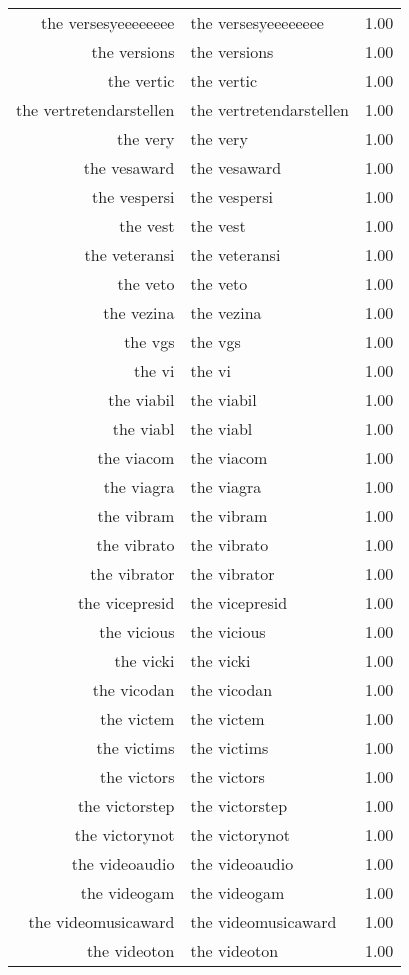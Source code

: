 \begin{table}[ht]
\begin{tabular}{rlr}
  the versesyeeeeeeee & the versesyeeeeeeee & 1.00 \\ 
  the versions & the versions & 1.00 \\ 
  the vertic & the vertic & 1.00 \\ 
  the vertretendarstellen & the vertretendarstellen & 1.00 \\ 
  the very & the very & 1.00 \\ 
  the vesaward & the vesaward & 1.00 \\ 
  the vespersi & the vespersi & 1.00 \\ 
  the vest & the vest & 1.00 \\ 
  the veteransi & the veteransi & 1.00 \\ 
  the veto & the veto & 1.00 \\ 
  the vezina & the vezina & 1.00 \\ 
  the vgs & the vgs & 1.00 \\ 
  the vi & the vi & 1.00 \\ 
  the viabil & the viabil & 1.00 \\ 
  the viabl & the viabl & 1.00 \\ 
  the viacom & the viacom & 1.00 \\ 
  the viagra & the viagra & 1.00 \\ 
  the vibram & the vibram & 1.00 \\ 
  the vibrato & the vibrato & 1.00 \\ 
  the vibrator & the vibrator & 1.00 \\ 
  the vicepresid & the vicepresid & 1.00 \\ 
  the vicious & the vicious & 1.00 \\ 
  the vicki & the vicki & 1.00 \\ 
  the vicodan & the vicodan & 1.00 \\ 
  the victem & the victem & 1.00 \\ 
  the victims & the victims & 1.00 \\ 
  the victors & the victors & 1.00 \\ 
  the victorstep & the victorstep & 1.00 \\ 
  the victorynot & the victorynot & 1.00 \\ 
  the videoaudio & the videoaudio & 1.00 \\ 
  the videogam & the videogam & 1.00 \\ 
  the videomusicaward & the videomusicaward & 1.00 \\ 
  the videoton & the videoton & 1.00 \\ 

\end{tabular}
\end{table}
